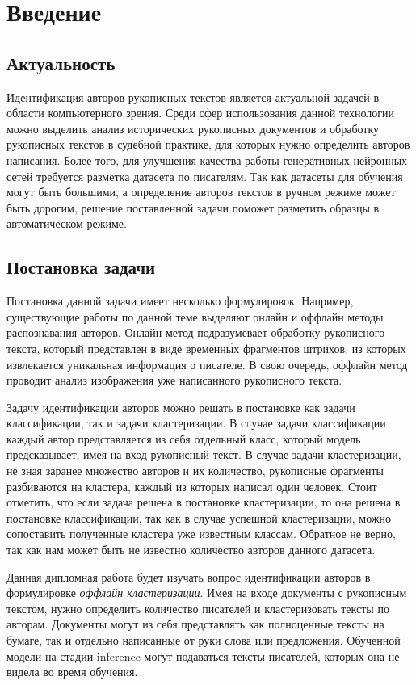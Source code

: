 
\section{Введение}

\subsection{Актуальность}
    Идентификация авторов рукописных текстов является актуальной задачей в области компьютерного зрения. Среди сфер использования данной технологии можно выделить анализ исторических рукописных документов и обработку рукописных текстов в судебной практике, для которых нужно определить авторов написания. Более того, для улучшения качества работы генеративных нейронных сетей требуется разметка датасета по писателям. Так как датасеты для обучения могут быть большими, а определение авторов текстов в ручном режиме может быть дорогим, решение поставленной задачи поможет разметить образцы в автоматическом режиме.

\subsection{Постановка задачи}
    Постановка данной задачи имеет несколько формулировок. Например, существующие работы по данной теме выделяют онлайн и оффлайн методы распознавания авторов. Онлайн метод подразумевает обработку рукописного текста, который представлен в виде временн\'{ы}х фрагментов штрихов, из которых извлекается уникальная информация о писателе. В свою очередь, оффлайн метод проводит анализ изображения уже написанного рукописного текста.
    
    Задачу идентификации авторов можно решать в постановке как задачи классификации, так и задачи кластеризации. В случае задачи классификации каждый автор представляется из себя отдельный класс, который модель предсказывает, имея на вход рукописный текст. В случае задачи кластеризации, не зная заранее множество авторов и их количество, рукописные фрагменты разбиваются на кластера, каждый из которых написал один человек. Стоит отметить, что если задача решена в постановке кластеризации, то она решена в постановке классификации, так как в случае успешной кластеризации, можно сопоставить полученные кластера уже известным классам. Обратное не верно, так как нам может быть не известно количество авторов данного датасета.

    Данная дипломная работа будет изучать вопрос идентификации авторов в формулировке \textit{оффлайн кластеризации}. Имея на входе документы с рукописным текстом, нужно определить количество писателей и кластеризовать тексты по авторам. Документы могут из себя представлять как полноценные тексты на бумаге, так и отдельно написанные от руки слова или предложения. Обученной модели на стадии inference могут подаваться тексты писателей, которых она не видела во время обучения.

